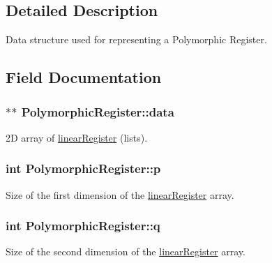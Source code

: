 \subsection{Detailed Description}
Data structure used for representing a Polymorphic Register. 

\subsection{Field Documentation}
\hypertarget{struct_polymorphic_register_a63cd536ae44db7801d00fb7fb2b1ce82}{}
\subsubsection[{data}]{$\ast$$\ast$ Polymorphic\+Register\+::data}\label{struct_polymorphic_register_a63cd536ae44db7801d00fb7fb2b1ce82}


2\+D array of \hyperlink{structlinear_register}{linear\+Register} (lists). 

\hypertarget{struct_polymorphic_register_aa3a9c856490b9914ade1c93cf90b647d}{}
\subsubsection[{p}]{\setlength{\rightskip}{0pt plus 5cm}int Polymorphic\+Register\+::p}\label{struct_polymorphic_register_aa3a9c856490b9914ade1c93cf90b647d}


Size of the first dimension of the \hyperlink{structlinear_register}{linear\+Register} array. 

\hypertarget{struct_polymorphic_register_a67acd3d6240f6bd56f1cdcbef715b718}{}
\subsubsection[{q}]{\setlength{\rightskip}{0pt plus 5cm}int Polymorphic\+Register\+::q}\label{struct_polymorphic_register_a67acd3d6240f6bd56f1cdcbef715b718}


Size of the second dimension of the \hyperlink{structlinear_register}{linear\+Register} array. 

\hypertarget{struct_polymorphic_register_a50360b225a043d149cd0b4e6ac4fdc05}{}
